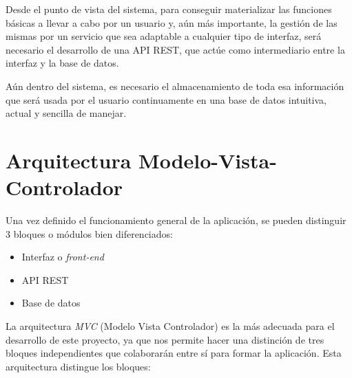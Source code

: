 Desde el punto de vista del sistema, para conseguir materializar las funciones básicas a llevar a cabo por un usuario y, aún más importante, la gestión de las mismas por un servicio que sea adaptable a cualquier tipo de interfaz, será necesario el desarrollo de una API REST, que actúe como intermediario entre la interfaz y la base de datos.

Aún dentro del sistema, es necesario el almacenamiento de toda esa información que será usada por el usuario continuamente en una base de datos intuitiva, actual y sencilla de manejar.


\section{Arquitectura Modelo-Vista-Controlador}
\label{sec::arquitecturaMVC}
Una vez definido el funcionamiento general de la aplicación, se pueden distinguir 3 bloques o módulos bien diferenciados:

\begin{itemize}
    \item Interfaz o \textit{front-end}
    \item API REST
    \item Base de datos
\end{itemize}
 
 La arquitectura \textit{MVC} (Modelo Vista Controlador) es la más adecuada para el desarrollo de este proyecto, ya que nos permite hacer una distinción de tres bloques independientes que colaborarán entre sí para formar la aplicación\cite{mvc2}\cite{mvc3}. Esta arquitectura distingue los bloques\cite{mvc1}:
 
